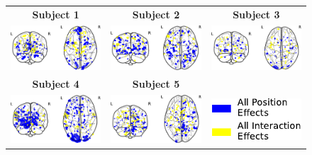 \begin{figure}[ht]
\scriptsize
\hspace{-4ex}
\begin{tabular}{ccc}
\textbf{\Large Subject 1} & \textbf{\Large Subject 2} & \textbf{\Large Subject 3}\\
{\includegraphics[width=.33\linewidth]{figures/part_II/all-effects_01.pdf}}
\hspace{-1ex}
&{\includegraphics[width=.33\linewidth]{figures/part_II/all-effects_03.pdf}}
\hspace{-1ex}
&{\includegraphics[width=.33\linewidth]{figures/part_II/all-effects_04.pdf}}
\hspace{-1ex}\\
\rule{0pt}{6ex}
\textbf{\Large Subject 4} & \textbf{\Large Subject 5} & {}\\
{\includegraphics[width=.33\linewidth]{figures/part_II/all-effects_05.pdf}}
\hspace{-1ex}
&{\includegraphics[width=.33\linewidth]{figures/part_II/all-effects_06.pdf}}
\hspace{-1ex}
&{\includegraphics[width=.2\linewidth]{figures/part_II/all-effects_legend.pdf}}

\end{tabular}
\end{figure}
